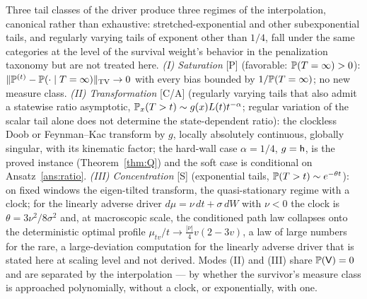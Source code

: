 \begin{theorem}
\label{thm:modes}
Three tail classes of the driver produce three regimes of the
interpolation, canonical rather than exhaustive: stretched-exponential
and other subexponential tails, and regularly varying tails of
exponent other than $1/4$, fall under the same categories at the
level of the survival weight's behavior in the penalization taxonomy
but are not treated here. \emph{(I) Saturation} [P] (favorable:
$\mathbb{P}(T=\infty)>0$): $\|\mathbb{P}^{(t)}-\mathbb{P}(\cdot\mid
T=\infty)\|_{\mathrm{TV}}\to0$ with every bias bounded by
$1/\mathbb{P}(T=\infty)$; no new measure class. \emph{(II) Transformation}
[C/A] (regularly varying tails that also admit a statewise ratio
asymptotic, $\mathbb{P}_x(T>t)\sim g(x)L(t)t^{-\alpha}$; regular variation of
the scalar tail alone does not determine the state-dependent ratio):
the clockless Doob or Feynman--Kac transform by $g$, locally absolutely
continuous, globally singular, with its kinematic factor; the hard-wall
case $\alpha=1/4$, $g=\mathsf{h}$, is the proved instance
(Theorem~\ref{thm:Q}) and the soft case is conditional on
Ansatz~\ref{ans:ratio}. \emph{(III) Concentration} [S]
(exponential tails, $\mathbb{P}(T>t)\sim e^{-\theta t}$): on fixed windows
the eigen-tilted transform, the quasi-stationary regime with a clock;
for the linearly adverse driver $d\mu=\nu\,dt+\sigma\,dW$ with
$\nu<0$ the clock is $\theta=3\nu^2/8\sigma^2$ and, at macroscopic
scale, the conditioned path law collapses onto the deterministic
optimal profile $\mu_{tv}/t\to\tfrac{|\nu|}4v(2-3v)$, a law of large
numbers for the rare, a large-deviation computation for the linearly
adverse driver that is stated here at scaling level and not derived. Modes (II) and (III) share $\mathbb{P}(\mathsf{V})=0$ and are separated by
the interpolation --- by whether the survivor's measure class is
approached polynomially, without a clock, or exponentially, with one.
\end{theorem}

